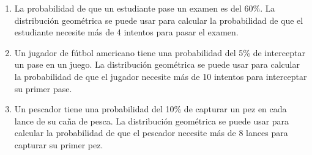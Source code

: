 \begin{Ejer}
\begin{enumerate}
    \item La probabilidad de que un estudiante pase un examen es del 60\%. La distribución geométrica se puede usar para calcular la probabilidad de que el estudiante necesite más de 4 intentos para pasar el examen.

    \item Un jugador de fútbol americano tiene una probabilidad del 5\% de interceptar un pase en un juego. La distribución geométrica se puede usar para calcular la probabilidad de que el jugador necesite más de 10 intentos para interceptar su primer pase.

    \item Un pescador tiene una probabilidad del 10\% de capturar un pez en cada lance de su caña de pesca. La distribución geométrica se puede usar para calcular la probabilidad de que el pescador necesite más de 8 lances para capturar su primer pez.
\end{enumerate}

\end{Ejer}

